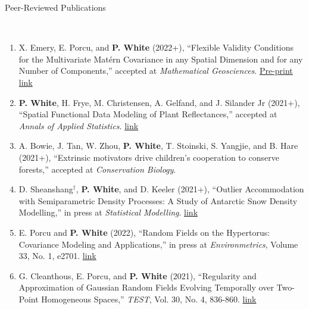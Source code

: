 \documentclass[11pt]{article}
\newcommand{\head}[1]{ %
    \bigskip %
    \begin{large}\begin{bf}{#1}\end{bf}\end{large} %

    \ \\ [-1.3cm] %

    \hrulefill}
\begin{document}
\vspace{2mm}
\head{Peer-Reviewed Publications}

\begin{enumerate}[label=$\bullet$]



\item X. Emery, E. Porcu, and \textbf{P. White} (2022+), ``Flexible Validity Conditions for the Multivariate Mat\'ern Covariance in any Spatial Dimension and for any Number of Components,'' accepted at \emph{Mathematical Geosciences}. \href{https://arxiv.org/abs/2101.04235}{Pre-print link} 

\item \textbf{P. White}, H. Frye, M. Christensen, A. Gelfand, and J. Silander Jr (2021+), ``Spatial Functional Data Modeling of Plant Reflectances,'' accepted at \emph{Annals of Applied Statistics}. \href{https://www.e-publications.org/ims/submission/AOAS/user/submissionFile/50412?confirm=86cb58ac}{link}

 \item A. Bowie, J. Tan, W. Zhou, \textbf{P. White}, T. Stoinski, S. Yangjie, and B. Hare (2021+), ``Extrinsic motivators drive children’s cooperation to conserve forests,'' accepted at \emph{Conservation Biology}. 

\item D. Sheanshang$^\dagger$, \textbf{P. White}, and D. Keeler (2021+), ``Outlier Accommodation with Semiparametric Density Processes: A Study of Antarctic Snow Density Modelling,'' in press at \emph{Statistical Modelling}. \href{https://doi.org/10.1177/1471082X211043946}{link}

\item  E. Porcu and \textbf{P. White} (2022), ``Random Fields on the Hypertorus: Covariance Modeling and Applications,'' in press at \emph{Environmetrics}, Volume 33, No. 1, e2701. \href{https://doi.org/10.1002/env.2701}{link}




\item G. Cleanthous, E. Porcu, and \textbf{P. White} (2021), ``Regularity and Approximation of Gaussian Random Fields Evolving Temporally over Two-Point Homogeneous Spaces,'' \textit{TEST}, Vol. 30, No. 4, 836-860.  \href{https://link.springer.com/article/10.1007/s11749-021-00755-1}{link}



\end{enumerate}
\end{document}

